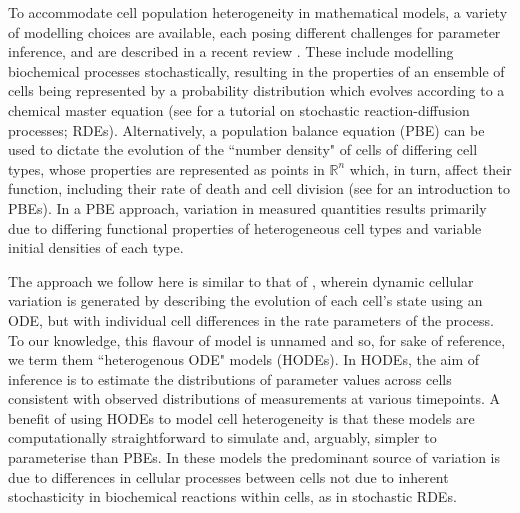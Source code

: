 \documentclass[10pt,letterpaper]{article}
\begin{document}
To accommodate cell population heterogeneity in mathematical models, a variety of modelling choices are available, each posing different challenges for parameter inference, and are described in a recent review \cite{waldherr2018estimation}. These include modelling biochemical processes stochastically, resulting in the properties of an ensemble of cells being represented by a probability distribution which evolves according to a chemical master equation (see \cite{erban2007practical} for a tutorial on stochastic reaction-diffusion processes; RDEs). Alternatively, a population balance equation (PBE) can be used to dictate the evolution of the ``number density" of cells of differing cell types, whose properties are represented as points in $\mathbb{R}^n$ which, in turn, affect their function, including their rate of death and cell division (see \cite{ramkrishna2014population} for an introduction to PBEs). In a PBE approach, variation in measured quantities results primarily due to differing functional properties of heterogeneous cell types and variable initial densities of each type. 

The approach we follow here is similar to that of \cite{dixit2018maximum}, wherein dynamic cellular variation is generated by describing the evolution of each cell's state using an ODE, but with individual cell differences in the rate parameters of the process. To our knowledge, this flavour of model is unnamed and so, for sake of reference, we term them ``heterogenous ODE" models (HODEs). In HODEs, the aim of inference is to estimate the distributions of parameter values across cells consistent with observed distributions of measurements at various timepoints. A benefit of using HODEs to model cell heterogeneity is that these models are computationally straightforward to simulate and, arguably, simpler to parameterise than PBEs. In these models the predominant source of variation is due to differences in cellular processes between cells not due to inherent stochasticity in biochemical reactions within cells, as in stochastic RDEs.
\end{document}
